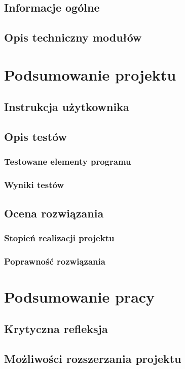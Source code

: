 \documentclass[12pt, oneside]{report}
\theoremstyle{definition}
\begin{document}
\section{Informacje ogólne} 
\section{Opis techniczny modułów}


\newpage
\chapter{Podsumowanie projektu}
\section{Instrukcja użytkownika}
\section{Opis testów}
\subsection{Testowane elementy programu}
\subsection{Wyniki testów}
\section{Ocena rozwiązania}
\subsection{Stopień realizacji projektu}
\subsection{Poprawność rozwiązania}

	
\newpage
\chapter{Podsumowanie pracy}
\section{Krytyczna refleksja}
\section{Możliwości rozszerzania projektu}
\end{document}
